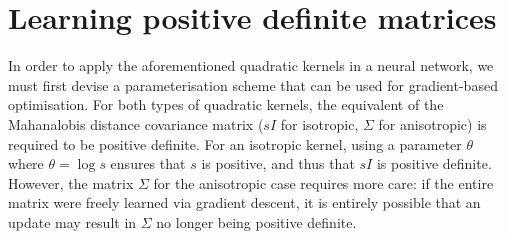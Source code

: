 \documentclass[a4paper, 12pt]{report}
\begin{document}
\section{Learning positive definite matrices}
\label{sec:learning-pdm}
In order to apply the aforementioned quadratic kernels in a neural network, we must first devise a parameterisation scheme that can be used for gradient-based optimisation. For both types of quadratic kernels, the equivalent of the Mahanalobis distance covariance matrix ($sI$ for isotropic, $\Sigma$ for anisotropic) is required to be positive definite. For an isotropic kernel, using a parameter $\theta$ where $\theta = \log s$ ensures that $s$ is positive, and thus that $sI$ is positive definite. However, the matrix $\Sigma$ for the anisotropic case requires more care: if the entire matrix were freely learned via gradient descent, it is entirely possible that an update may result in $\Sigma$ no longer being positive definite.
\end{document}
